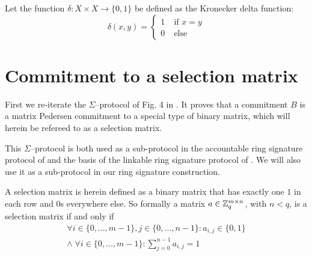 
\begin{definition}\label{def:delta}
	Let the function $\delta : X \times X \to \{ 0, 1 \}$ be defined as the Kronecker delta function:
	$$
		\delta(x, y) = \begin{cases}
			1 \; & \text{if } x = y \\
			0 \; & \text{else}
		\end{cases}
	$$
\end{definition}


\clearpage


\section{Commitment to a selection matrix}
\label{commitment_mat}

First we re-iterate the $\Sigma$--protocol of Fig. 4 in \cite{short_ring_signatures}.
It proves that a commitment $B$ is a matrix Pedersen commitment to a special type of binary matrix, which will herein be refereed to as a selection matrix.

This $\Sigma$--protocol is both used as a sub-protocol in the accountable ring signature protocol of \cite{short_ring_signatures} and the basis of the linkable ring signature protocol of \cite{triptych}.
We will also use it as a sub-protocol in our ring signature construction.

\begin{definition}
A selection matrix is herein defined as a binary matrix that has exactly one $1$ in each row and $0$s everywhere else.
So formally a matrix $a \in \mathbb Z_q^{m \times n}$, with $n < q$, is a selection matrix if and only if
$$\begin{matrix}
	\forall i \in \{ 0, ..., m-1 \}, j \in \{ 0, ..., n-1 \} : a_{i,j} \in \{ 0, 1 \} \\
	\land \; \forall i \in \{ 0, ..., m-1 \} : \sum_{j=0}^{n-1} a_{i,j} = 1
\end{matrix}$$
\end{definition}


